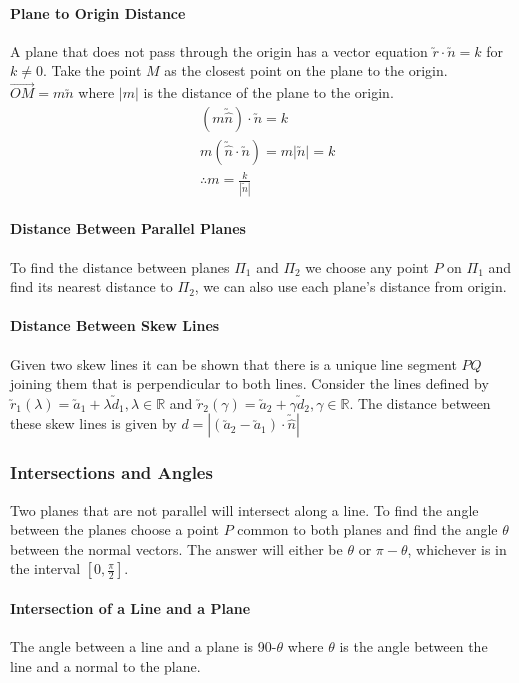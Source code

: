 \documentclass[a4paper,twoside]{article}
\begin{document}
				\paragraph{Plane to Origin Distance} A plane that does not pass through the origin has a vector equation $\utilde{r}\cdot\utilde{n}=k$ for $k\neq0$. Take the point $M$ as the closest point on the plane to the origin. $\overrightarrow{OM}=m\utilde{n}$ where $|m|$ is the distance of the plane to the origin.
				\begin{align*}
					&\left(m\utilde{\hat{n}}\right)\cdot\utilde{n}=k \\
					&m\left(\utilde{\hat{n}}\cdot\utilde{n}\right)=m|\utilde{n}|=k\\
					&\therefore m=\frac{k}{|\utilde{n}|}
				\end{align*}
			
				\paragraph{Distance Between Parallel Planes} To find the distance between planes $\Pi_1$ and $\Pi_2$ we choose any point $P$ on $\Pi_1$ and find its nearest distance to $\Pi_2$, we can also use each plane's distance from origin.
				
				\paragraph{Distance Between Skew Lines} Given two skew lines it can be shown that there is a unique line segment $PQ$ joining them that is perpendicular to both lines. Consider the lines defined by $\utilde{r}_1(\lambda)=\utilde{a}_1+\lambda\utilde{d}_1,\lambda\in\mathbb{R}$ and $\utilde{r}_2(\gamma)=\utilde{a}_2+\gamma\utilde{d}_2,\gamma\in\mathbb{R}$. The distance between these skew lines is given by $d=\left|\left(\utilde{a}_2-\utilde{a}_1\right)\cdot\utilde{\hat{n}}\right|$
			
			\subsubsection{Intersections and Angles}
				Two planes that are not parallel will intersect along a line. To find the angle between the planes choose a point $P$ common to both planes and find the angle $\theta$ between the normal vectors. The answer will either be $\theta$ or $\pi-\theta$, whichever is in the interval $[0,\frac{\pi}{2}]$.
				
				\paragraph{Intersection of a Line and a Plane} The angle between a line and a plane is 90\degree-$\theta$ where $\theta$ is the angle between the line and a normal to the plane.
			
\end{document}
